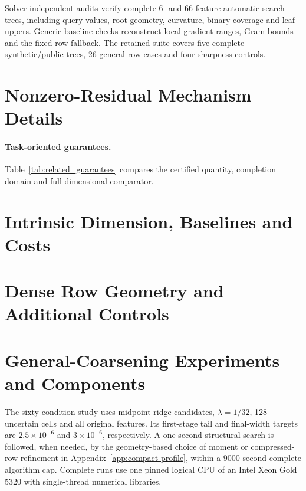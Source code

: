 Solver-independent audits verify complete 6- and 66-feature automatic search trees, including query values, root geometry, curvature, binary coverage and leaf uppers. Generic-baseline checks reconstruct local gradient ranges, Gram bounds and the fixed-row fallback. The retained suite covers five complete synthetic/public trees, 26 general row cases and four sharpness controls.


\section{Nonzero-Residual Mechanism Details}

\paragraph{Task-oriented guarantees.} Table~\ref{tab:related_guarantees} compares the certified quantity, completion domain and full-dimensional comparator.\label{app:sensitivity-v79}


\section{Intrinsic Dimension, Baselines and Costs}







\section{Dense Row Geometry and Additional Controls}\label{app:extensions}












\section{General-Coarsening Experiments and Components}\label{app:general-public}
The sixty-condition study uses midpoint ridge candidates, $\lambda=1/32$, 128 uncertain cells and all original features. Its first-stage tail and final-width targets are $2.5\times10^{-6}$ and $3\times10^{-6}$, respectively. A one-second structural search is followed, when needed, by the geometry-based choice of moment or compressed-row refinement in Appendix~\ref{app:compact-profile}, within a 9000-second complete algorithm cap. Complete runs use one pinned logical CPU of an Intel Xeon Gold 5320 with single-thread numerical libraries.



